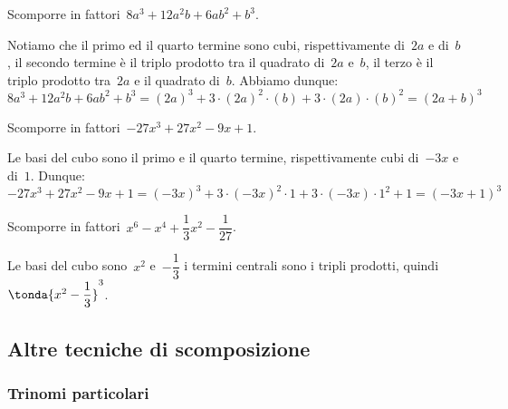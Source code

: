  \begin{esempio}
Scomporre in fattori~\(8a^{3}+12a^{2}b+6{ab}^{2}+b^{3}\).

Notiamo che il primo ed il quarto termine sono cubi, rispettivamente 
di~\(2a\) e di~\(b\), 
il secondo termine è il triplo prodotto tra il quadrato di~\(2a\) e~\(b\), 
il terzo è il triplo prodotto tra~\(2a\) e il quadrato di~\(b\).
Abbiamo dunque:
\[8a^{3}+12a^{2}b+6ab^{2}+b^{3}=
  (2a)^{3}+3\cdot (2a)^{2}\cdot (b)+3\cdot (2a)\cdot (b)^{2}=(2a+b)^{3}\]
 \end{esempio}

 \begin{esempio}
Scomporre in fattori~\(-27x^3+27x^2-9x+1\).

Le basi del cubo sono il primo e il quarto termine, rispettivamente cubi 
di~\(-3x\) e di~\(1\).
Dunque:
\[-27x^3+27x^2-9x+1=
  (-3x)^{3}+3\cdot (-3x)^{2}\cdot 1+3\cdot (-3x)\cdot 1^{2}+1=(-3x+1)^{3}\]
 \end{esempio}

 \begin{esempio}
Scomporre in fattori~\(x^6-x^4+\dfrac{1}{3}x^2-\dfrac{1}{27}\).

Le basi del cubo sono~\(x^2\) e~\(-\dfrac{1}{3}\) i termini centrali sono i 
tripli prodotti, quindi~\(\tonda{x^2-\dfrac{1}{3}}^{3}\).
\end{esempio}





\subsection{Altre tecniche di scomposizione}
\label{subsec:divpol_altretecniche}

\subsubsection{Trinomi particolari}
\label{subsubsec:trinpart}

